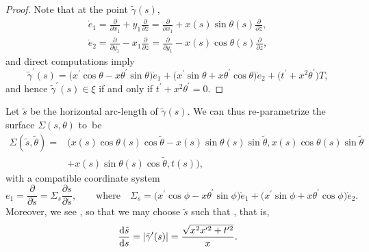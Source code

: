 \documentclass[10pt,a4paper]{amsart}
\numberwithin{equation}{section}
\begin{document}
\begin{proof}
Note that at the point $\tilde{\gamma}(s)$,
\begin{gather*}
\mathring e_1=\frac{\partial}{\partial x_1}+y_1\frac{\partial}{\partial z}=
\frac{\partial}{\partial x_1}+x(s)\sin \theta(s)\frac{\partial}{\partial z},
\\
\mathring e_2=\frac{\partial}{\partial y_1}-x_1\frac{\partial}{\partial z}=
\frac{\partial}{\partial y_1}-x(s)\cos \theta(s)\frac{\partial}{\partial z},
\end{gather*}
and direct computations imply
\begin{equation*}
\tilde{\gamma}^{\prime }(s)=\big(x^{\prime }\cos \theta-x\theta^{\prime }\sin
\theta\big)\mathring e_1+\big(x^{\prime }\sin \theta+x\theta^{\prime }\cos
\theta\big)\mathring e_2+\big(t^{\prime}+x^{2}\theta^{\prime}\big)T,
\end{equation*}
and hence $\tilde{\gamma}^{\prime }(s)\in \xi$ if and only if $t^{\prime}+x^{2}\theta^{\prime}=0$.
\end{proof}

Let $\tilde{s}$ be the horizontal arc-length of $\tilde{\gamma}(s)$. We can thus re-parametrize the surface $\Sigma(s,\theta)$ to~be
\begin{align*} %
\Sigma(\tilde s,\tilde \theta)={}&\bigl(x(s)\cos \theta(s)\cos \tilde
\theta-x(s)\sin \theta(s)\sin \tilde \theta,x(s)\cos \theta(s)\sin \tilde
\theta\\
&+x(s)\sin \theta(s)\cos \tilde \theta,t(s)\bigr),
\end{align*}
with a compatible coordinate system
\[
e_1=\frac{\partial}{\partial \tilde s}=\Sigma_s\frac{\partial s}{\partial
\tilde s}, \qquad \text{where} \quad \Sigma_s=\bigl(x^{\prime }\cos
\phi-x\theta^{\prime }\sin \phi\bigr)\mathring e_1+
\bigl(x^{\prime }\sin \phi+x\theta^{\prime }\cos \phi\bigr)\mathring e_2.
\]
Moreover, we see
,
so that we may choose $\tilde s$ such that , that is,
\begin{equation}\label{excss}
\frac{{\rm d}\tilde s}{{\rm d}s}=|\tilde{\gamma}^{\prime }(s)|=\frac{\sqrt{x^2x^{\prime 2}+t^{\prime 2}}}{x}.
\end{equation}
\end{document}
